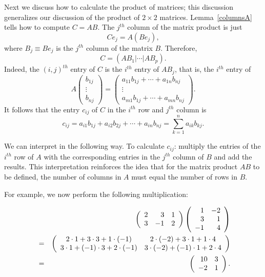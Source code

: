 Next we discuss how to calculate the product of matrices; this
discussion generalizes our discussion of the product of $2\times 2$
matrices.  Lemma~\ref{columnsA} tells how to compute $C=AB$.  The $j^{th}$
column of the matrix product is just
\[
Ce_j = A(Be_j),
\]
where $B_j\equiv Be_j$ is the $j^{th}$ column of the matrix $B$.  Therefore,
\begin{equation}  \label{E:matprod}
C = (AB_1|\cdots|AB_p).
\end{equation}
Indeed, the $(i,j)^{th}$ entry of $C$ is the $i^{th}$ entry of $AB_j$,
that is, the $i^{th}$ entry of
\[
A\left(\begin{array}{c} b_{1j}\\ \vdots\\
b_{nj}\end{array}\right)
=
\left(\begin{array}{c} a_{11}b_{1j} + \cdots + a_{1n}b_{nj} \\
\vdots \\ a_{m1}b_{1j} + \cdots + a_{mn}b_{nj}
\end{array}\right).
\]
It follows that the entry $c_{ij}$ of $C$ in the $i^{th}$ row and
$j^{th}$ column is
\begin{equation} \label{multij}
c_{ij} = a_{i1}b_{1j} + a_{i2}b_{2j} + \cdots + a_{in}b_{nj} =
\sum_{k=1}^n a_{ik}b_{kj}.
\end{equation}

We can interpret  in the following way.  To calculate $c_{ij}$:
multiply the entries of the $i^{th}$ row of $A$ with the corresponding
entries in the $j^{th}$ column of $B$ and add the results.  This
interpretation reinforces the
idea that for the matrix product $AB$ to be defined, the number of columns
in $A$ must equal the number of rows in $B$.

For example, we now perform the following multiplication:

\begin{eqnarray*}
& & \left(\begin{array}{rrr} 2 & 3 & 1 \\ 3 & -1 & 2 \end{array}\right)
\left(\begin{array}{rr} 1 & -2 \\ 3 & 1 \\ -1 & 4 \end{array}\right)\\
& = & \left(\begin{array}{cc} 2\cdot 1+3\cdot 3 + 1\cdot(-1) & 2\cdot(-2)+3\cdot 1+1\cdot 4\\ 3\cdot 1 + (-1)\cdot 3+2\cdot(-1) &3\cdot(-2)+(-1)\cdot 1+2\cdot 4\end{array}\right)\\
& = & \left(\begin{array}{rr} 10 & 3\\ -2 &1\end{array}\right).
\end{eqnarray*}

